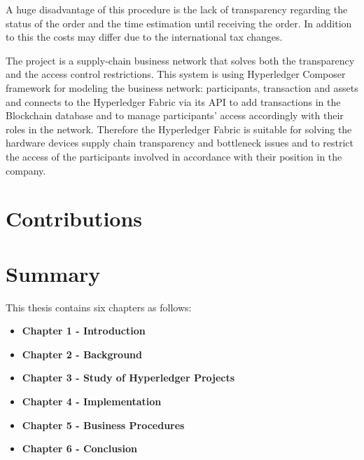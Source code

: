 A huge disadvantage of this procedure is the lack of transparency regarding the status of the order and the time estimation until receiving the order.
In addition to this the costs may differ due to the international tax changes. 

The \textbf{\emph{{\project}}} project is a supply-chain business network that solves both the transparency and the access control restrictions.
This system is using Hyperledger Composer framework for modeling the business network: participants, transaction and assets and connects to the Hyperledger Fabric via its API to add transactions in the Blockchain database and to manage participants' access accordingly with their roles in the network.
Therefore the Hyperledger Fabric is suitable for solving the hardware devices supply chain transparency and bottleneck issues and to restrict the access of the participants involved in accordance with their position in the company.


\section{Contributions}
\label{sec:intro-sec3}

\section{Summary}
\label{sec:intro-sec4}
This thesis contains six chapters as follows:
\begin{itemize}
	\item \textbf{Chapter 1 - Introduction}
	\item \textbf{Chapter 2 - Background}
	\item \textbf{Chapter 3 - Study of Hyperledger Projects}
	\item \textbf{Chapter 4 - Implementation}
	\item \textbf{Chapter 5 - Business Procedures}
	\item \textbf{Chapter 6 - Conclusion}
\end{itemize}














